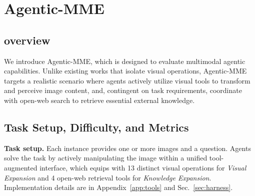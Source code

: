 \documentclass[runningheads]{llncs}
\theoremstyle{plain}
\theoremstyle{definition}
\theoremstyle{remark}
\begin{document}
\section{Agentic-MME}
\vspace{-2mm}
\subsection{overview}
\label{sec:benchmark_overview}
We introduce Agentic-MME, which is designed to evaluate multimodal agentic capabilities. Unlike existing works that isolate visual operations, Agentic-MME targets a realistic scenario where agents actively utilize visual tools to transform and perceive image content, and, contingent on task requirements, coordinate with open-web search to retrieve essential external knowledge.
\subsection{Task Setup, Difficulty, and Metrics}
\label{sec:task_setup}
\noindent\textbf{Task setup.}
Each instance provides one or more images and a question. Agents solve the task by actively manipulating the image within a unified tool-augmented interface, which equips with 13 distinct visual operations for \textit{Visual Expansion} and 4 open-web retrieval tools for \textit{Knowledge Expansion}. Implementation details are in Appendix~\ref{app:tools} and Sec.~\ref{sec:harness}.
\end{document}
